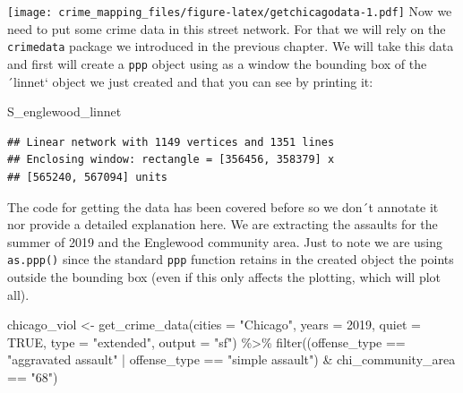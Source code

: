 \documentclass[
  krantz2]{krantz}
\makeatletter
\newenvironment{Shaded}{\begin{snugshade}}{\end{snugshade}}
\newcommand{\AttributeTok}[1]{\textcolor[rgb]{0.61,0.61,0.61}{#1}}
\newcommand{\ConstantTok}[1]{\textcolor[rgb]{0,0,0}{#1}}
\newcommand{\DecValTok}[1]{\textcolor[rgb]{0.06,0.06,0.06}{#1}}
\newcommand{\FunctionTok}[1]{\textcolor[rgb]{0,0,0}{#1}}
\newcommand{\NormalTok}[1]{#1}
\newcommand{\OtherTok}[1]{\textcolor[rgb]{0.37,0.37,0.37}{#1}}
\newcommand{\SpecialCharTok}[1]{\textcolor[rgb]{0,0,0}{#1}}
\newcommand{\StringTok}[1]{\textcolor[rgb]{0.5,0.5,0.5}{#1}}
\newenvironment{kframe}{%
\medskip{}
\setlength{\fboxsep}{.8em}
 \def\at@end@of@kframe{}%
 \ifinner\ifhmode%
  \def\at@end@of@kframe{\end{minipage}}%
  \begin{minipage}{\columnwidth}%
 \fi\fi%
 \def\FrameCommand##1{\hskip\@totalleftmargin \hskip-\fboxsep
 \colorbox{shadecolor}{##1}\hskip-\fboxsep
     \hskip-\linewidth \hskip-\@totalleftmargin \hskip\columnwidth}%
 \MakeFramed {\advance\hsize-\width
   \@totalleftmargin\z@ \linewidth\hsize
   \@setminipage}}%
 {\par\unskip\endMakeFramed%
 \at@end@of@kframe}
\renewenvironment{Shaded}{\begin{kframe}}{\end{kframe}}
\makeatother
\begin{document}
\texttt{[image: crime\_mapping\_files/figure-latex/getchicagodata-1.pdf]}
Now we need to put some crime data in this street network. For that we will rely on the \texttt{crimedata} package we introduced in the previous chapter. We will take this data and first will create a \texttt{ppp} object using as a window the bounding box of the ´linnet` object we just created and that you can see by printing it:

\begin{Shaded}
\begin{Highlighting}[]
\NormalTok{S\_englewood\_linnet}
\end{Highlighting}
\end{Shaded}

\begin{verbatim}
## Linear network with 1149 vertices and 1351 lines
## Enclosing window: rectangle = [356456, 358379] x 
## [565240, 567094] units
\end{verbatim}

The code for getting the data has been covered before so we don´t annotate it nor provide a detailed explanation here. We are extracting the assaults for the summer of 2019 and the Englewood community area. Just to note we are using \texttt{as.ppp()} since the standard \texttt{ppp} function retains in the created object the points outside the bounding box (even if this only affects the plotting, which will plot all).

\begin{Shaded}
\begin{Highlighting}[]
\NormalTok{chicago\_viol }\OtherTok{\textless{}{-}} \FunctionTok{get\_crime\_data}\NormalTok{(}\AttributeTok{cities =} \StringTok{"Chicago"}\NormalTok{, }\AttributeTok{years =} \DecValTok{2019}\NormalTok{, }\AttributeTok{quiet =} \ConstantTok{TRUE}\NormalTok{,}
                               \AttributeTok{type =} \StringTok{"extended"}\NormalTok{, }\AttributeTok{output =} \StringTok{"sf"}\NormalTok{) }\SpecialCharTok{\%\textgreater{}\%}
  \FunctionTok{filter}\NormalTok{((offense\_type }\SpecialCharTok{==} \StringTok{"aggravated assault"} \SpecialCharTok{|} 
\NormalTok{           offense\_type }\SpecialCharTok{==} \StringTok{"simple assault"}\NormalTok{) }\SpecialCharTok{\&}\NormalTok{ chi\_community\_area }\SpecialCharTok{==} \StringTok{"68"}\NormalTok{)}
\end{Highlighting}
\end{Shaded}
\end{document}
